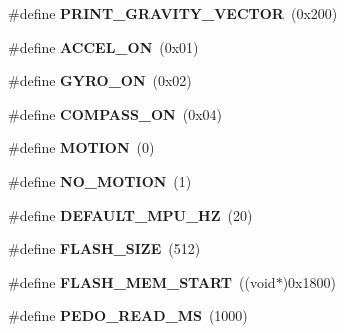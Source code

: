 \begin{DoxyCompactItemize}
\item 
\hypertarget{group__e_m_p_l_ga31581e6a5034c28ac6270530f4b17e51}{}\#define {\bfseries P\+R\+I\+N\+T\+\_\+\+G\+R\+A\+V\+I\+T\+Y\+\_\+\+V\+E\+C\+T\+O\+R}~(0x200)\label{group__e_m_p_l_ga31581e6a5034c28ac6270530f4b17e51}

\item 
\hypertarget{group__e_m_p_l_ga96e2dc57b8fe509f98cbbb52811717c3}{}\#define {\bfseries A\+C\+C\+E\+L\+\_\+\+O\+N}~(0x01)\label{group__e_m_p_l_ga96e2dc57b8fe509f98cbbb52811717c3}

\item 
\hypertarget{group__e_m_p_l_ga1abb1b0f967cb0c0f3a0910f18241889}{}\#define {\bfseries G\+Y\+R\+O\+\_\+\+O\+N}~(0x02)\label{group__e_m_p_l_ga1abb1b0f967cb0c0f3a0910f18241889}

\item 
\hypertarget{group__e_m_p_l_gac4b29ad9d2af05af504ca053f3c5d76d}{}\#define {\bfseries C\+O\+M\+P\+A\+S\+S\+\_\+\+O\+N}~(0x04)\label{group__e_m_p_l_gac4b29ad9d2af05af504ca053f3c5d76d}

\item 
\hypertarget{group__e_m_p_l_ga37210bcb4e70d9199030fb7cd89135e7}{}\#define {\bfseries M\+O\+T\+I\+O\+N}~(0)\label{group__e_m_p_l_ga37210bcb4e70d9199030fb7cd89135e7}

\item 
\hypertarget{group__e_m_p_l_ga35a7dc3ebde5e1980ce1412334326f28}{}\#define {\bfseries N\+O\+\_\+\+M\+O\+T\+I\+O\+N}~(1)\label{group__e_m_p_l_ga35a7dc3ebde5e1980ce1412334326f28}

\item 
\hypertarget{group__e_m_p_l_ga292d717406e906831952ce46612fe4cd}{}\#define {\bfseries D\+E\+F\+A\+U\+L\+T\+\_\+\+M\+P\+U\+\_\+\+H\+Z}~(20)\label{group__e_m_p_l_ga292d717406e906831952ce46612fe4cd}

\item 
\hypertarget{group__e_m_p_l_gae69620948dea1b76e0ab7843ab719db7}{}\#define {\bfseries F\+L\+A\+S\+H\+\_\+\+S\+I\+Z\+E}~(512)\label{group__e_m_p_l_gae69620948dea1b76e0ab7843ab719db7}

\item 
\hypertarget{group__e_m_p_l_ga923aad67335bb52801a4f8dfc0b0fef0}{}\#define {\bfseries F\+L\+A\+S\+H\+\_\+\+M\+E\+M\+\_\+\+S\+T\+A\+R\+T}~((void$\ast$)0x1800)\label{group__e_m_p_l_ga923aad67335bb52801a4f8dfc0b0fef0}

\item 
\hypertarget{group__e_m_p_l_ga77888d9bc269c75d63baf58cd000c7d9}{}\#define {\bfseries P\+E\+D\+O\+\_\+\+R\+E\+A\+D\+\_\+\+M\+S}~(1000)\label{group__e_m_p_l_ga77888d9bc269c75d63baf58cd000c7d9}


\end{DoxyCompactItemize}

